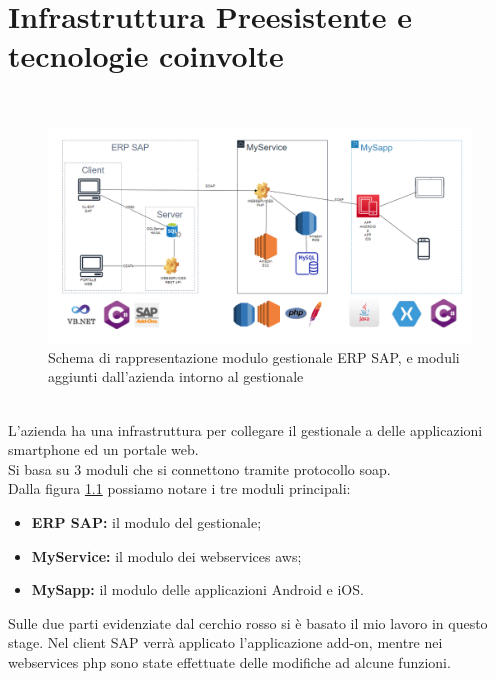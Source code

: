 
\chapter{Infrastruttura Preesistente e tecnologie coinvolte}
\label{cap:descrizione-architettura}

\\
\begin{figure}[!h] 
	\centering 
	\includegraphics[scale = 0.4]{immagini/architettura-globale.png} 
	\caption{Schema di rappresentazione modulo gestionale ERP SAP, e moduli aggiunti dall'azienda intorno al gestionale}
	\label{fig:2-1}
\end{figure}\\
L'azienda ha una infrastruttura per collegare il gestionale a delle applicazioni smartphone ed un portale web. \\Si basa su 3 moduli che si connettono tramite protocollo \gls{soap}.
\\
Dalla figura \ref{fig:2-1} possiamo notare i tre moduli principali:
\begin{itemize}
	\item \textbf{ERP SAP:} il modulo del gestionale;
	\item \textbf{MyService:} il modulo dei webservices \gls{aws};
	\item \textbf{MySapp:} il modulo delle applicazioni Android e iOS.\\
\end{itemize}
Sulle due parti evidenziate dal cerchio rosso si è basato il mio lavoro in questo stage.
Nel client SAP verrà applicato l'applicazione add-on, mentre nei webservices php sono state effettuate delle modifiche ad alcune funzioni.
